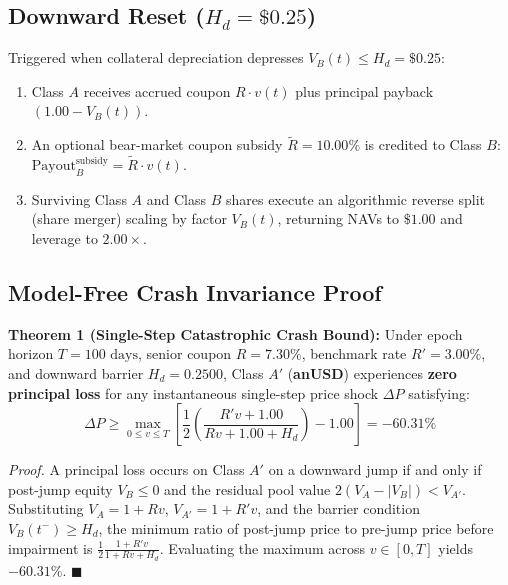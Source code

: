 \documentclass[10pt,journal,compsoc]{IEEEtran}
\begin{document}
\subsection{Downward Reset ($H_d = \$0.25$)}
Triggered when collateral depreciation depresses $V_B(t) \le H_d = \$0.25$:
\begin{enumerate}
    \item Class $A$ receives accrued coupon $R \cdot v(t)$ plus principal payback $(1.00 - V_B(t))$.
    \item An optional bear-market coupon subsidy $\tilde{R} = 10.00\%$ is credited to Class $B$: $\text{Payout}_B^{\text{subsidy}} = \tilde{R} \cdot v(t)$.
    \item Surviving Class $A$ and Class $B$ shares execute an algorithmic reverse split (share merger) scaling by factor $V_B(t)$, returning NAVs to $\$1.00$ and leverage to $2.00\times$.
\end{enumerate}

\subsection{Model-Free Crash Invariance Proof}
\textbf{Theorem 1 (Single-Step Catastrophic Crash Bound):} Under epoch horizon $T = 100\text{ days}$, senior coupon $R = 7.30\%$, benchmark rate $R' = 3.00\%$, and downward barrier $H_d = 0.2500$, Class $A'$ (\textbf{anUSD}) experiences \textbf{zero principal loss} for any instantaneous single-step price shock $\Delta P$ satisfying:
\begin{equation}
\Delta P \ge \max_{0 \le v \le T} \left[ \frac{1}{2} \left( \frac{R' v + 1.00}{R v + 1.00 + H_d} \right) - 1.00 \right] = \mathbf{-60.31\%}
\end{equation}

\textit{Proof.} A principal loss occurs on Class $A'$ on a downward jump if and only if post-jump equity $V_B \le 0$ and the residual pool value $2(V_A - |V_B|) < V_{A'}$. Substituting $V_A = 1 + Rv$, $V_{A'} = 1 + R'v$, and the barrier condition $V_B(t^-) \ge H_d$, the minimum ratio of post-jump price to pre-jump price before impairment is $\frac{1}{2} \frac{1 + R'v}{1 + Rv + H_d}$. Evaluating the maximum across $v \in [0, T]$ yields $-60.31\%$. $\blacksquare$
\end{document}
